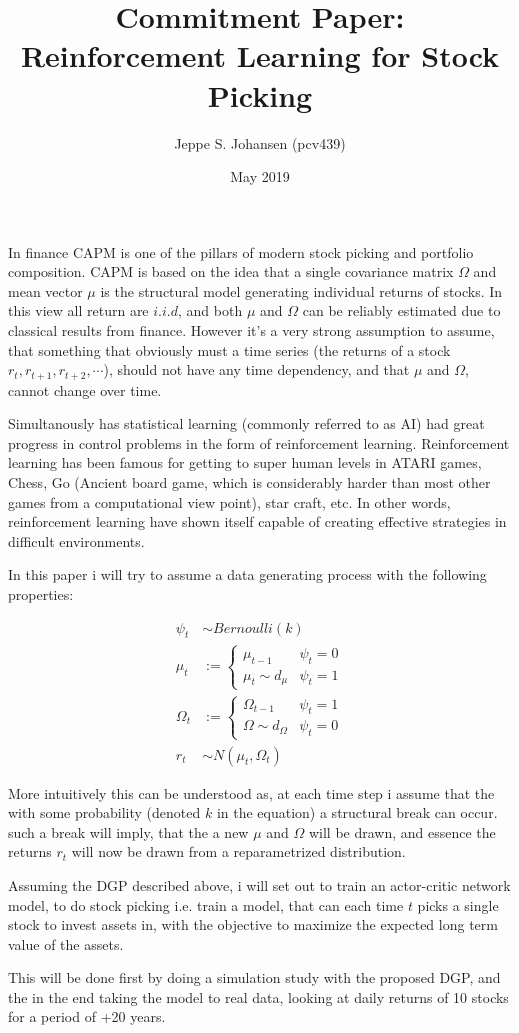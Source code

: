 \documentclass{article}
\title{Commitment Paper: Reinforcement Learning for Stock Picking}
\author{Jeppe S. Johansen (pcv439)}
\date{May 2019}
\begin{document}
\maketitle

In finance CAPM is one of the pillars of modern stock picking and portfolio composition. CAPM is based on the idea that a single covariance matrix $\Omega$ and mean vector $\mu$ is the structural model generating individual returns of stocks. In this view all return are $i.i.d$, and both $\mu$ and $\Omega$ can be reliably estimated due to classical results from finance. However it’s a very strong assumption to assume, that something that obviously must a time series (the returns of a stock $r_t, r_{t+1}, r_{t+2},  \cdots $), should not have any time dependency, and that $\mu$ and $\Omega$, cannot change over time.

Simultanously has statistical learning (commonly referred to as AI) had great progress in control problems in the form of reinforcement learning. Reinforcement learning has been famous for getting to super human levels in ATARI games, Chess, Go (Ancient board game, which is considerably harder than most other games from a computational view point), star craft, etc. In other words, reinforcement learning have shown itself capable of creating effective strategies in difficult environments.

In this paper i will try to assume a data generating process with the following properties:

\begin{align}
  \psi_t &\sim Bernoulli(k) \\
  \mu_t &:=
  \begin{cases}
    \mu_{t-1} & \psi_t = 0 \\
    \mu_t \sim d_{\mu} & \psi_t =1
  \end{cases} \\
  \Omega_t &:=
  \begin{cases}
    \Omega_{t-1} & \psi_t = 1 \\
    \Omega \sim d_{\Omega} & \psi_t = 0
  \end{cases} \\
  r_t &\sim N(\mu_t , \Omega_t)
\end{align}

More intuitively this can be understood as, at each time step i assume that the with some probability (denoted $k$ in the equation) a structural break can occur. such a break will imply, that the a new $\mu$ and $\Omega$ will be drawn, and essence the returns $r_t$ will now be drawn from a reparametrized distribution.

Assuming the DGP described above, i will set out to train an actor-critic network model, to do stock picking i.e. train a model, that can each time $t$ picks a single stock to invest assets in, with the objective to maximize the expected long term value of the assets.

This will be done first by doing a simulation study with the proposed  DGP, and the in the end taking the model to real data, looking at daily returns of 10 stocks for a  period of +20 years.
\end{document}
